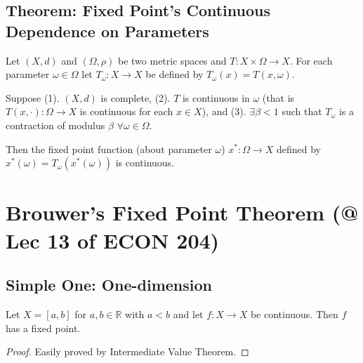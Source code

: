 \documentclass[11pt]{elegantbook}
\begin{document}
\subsection{Theorem: Fixed Point's Continuous Dependence on Parameters}
\begin{theorem}
    Let $(X, d)$ and $(\Omega, \rho)$ be two metric spaces and $T : X \times \Omega \rightarrow X$. For each parameter $\omega \in \Omega$ let $T_\omega : X \rightarrow X$ be defined by $T_\omega(x)=T(x,\omega)$.

    Suppose (1). $(X, d)$ is complete, (2). $T$ is continuous in $\omega$ (that is $T(x, \cdot) : \Omega \rightarrow X$ is continuous for each $x \in X$), and (3). $\exists \beta < 1$ such that $T_\omega$ is a contraction of modulus $\beta$ $\forall \omega \in \Omega$.
    
    Then the fixed point function (about parameter $\omega$) $x^*: \Omega \rightarrow X$ defined by $x^*(\omega)=T_\omega(x^*(\omega))$ is continuous.
\end{theorem}

\section{Brouwer's Fixed Point Theorem \small{(@ Lec 13 of ECON 204)}}
\subsection{Simple One: One-dimension}
\begin{theorem}
    Let $X = [a, b]$ for $a, b \in \mathbb{R}$ with $a < b$ and let $f : X \rightarrow X$ be continuous. Then $f$ has a fixed point.
\end{theorem}
\begin{proof}
    Easily proved by Intermediate Value Theorem.
\end{proof}
\end{document}
